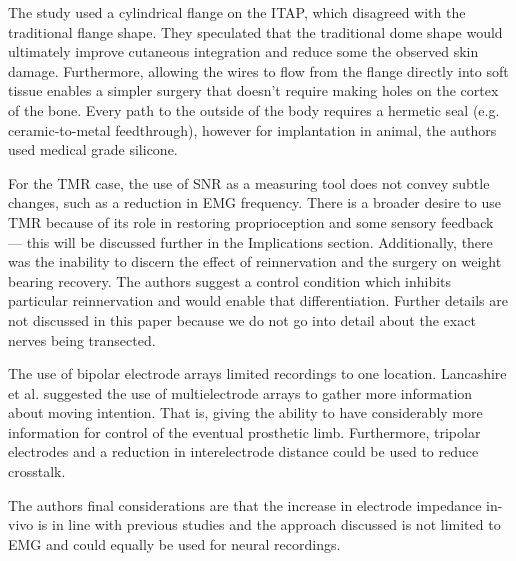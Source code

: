 The study used a cylindrical flange on the ITAP, which disagreed with the traditional flange shape.
They speculated that the traditional dome shape would ultimately improve cutaneous integration and reduce some the observed skin damage.
Furthermore, allowing the wires to flow from the flange directly into soft tissue enables a simpler surgery that doesn't require making holes on the cortex of the bone.
Every path to the outside of the body requires a hermetic seal (e.g. ceramic-to-metal feedthrough), however for implantation in animal, the authors used medical grade silicone.

For the TMR case, the use of SNR as a measuring tool does not convey subtle changes, such as a reduction in EMG frequency.
There is a broader desire to use TMR because of its role in restoring proprioception and some sensory feedback --- this will be discussed further in the Implications section.
Additionally, there was the inability to discern the effect of reinnervation and the surgery on weight bearing recovery.
The authors suggest a control condition which inhibits particular reinnervation and would enable that differentiation.
Further details are not discussed in this paper because we do not go into detail about the exact nerves being transected.

The use of bipolar electrode arrays limited recordings to one location.
Lancashire et al. suggested the use of multielectrode arrays to gather more information about moving intention.
That is, giving the ability to have considerably more information for control of the eventual prosthetic limb.
Furthermore, tripolar electrodes and a reduction in interelectrode distance could be used to reduce crosstalk.

The authors final considerations are that the increase in electrode impedance in-vivo is in line with previous studies and the approach discussed is not limited to EMG and could equally be used for neural recordings.
